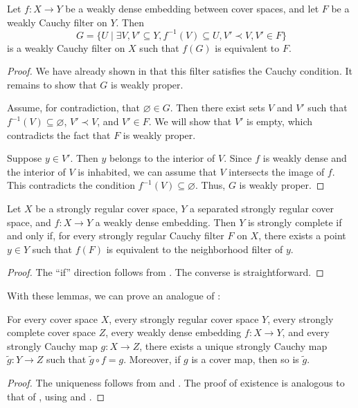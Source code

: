 \documentclass[pdflatex,sn-mathphys-num]{sn-jnl}
\theoremstyle{definition}
\theoremstyle{remark}
\numberwithin{figure}{section}
\newcommand{\rb}{\prec}
\begin{document}
\begin{lem}
Let $f : X \to Y$ be a weakly dense embedding between cover spaces, and let $F$ be a weakly Cauchy filter on $Y$.
Then
\[ G = \{ U \mid \exists V,V' \subseteq Y, f^{-1}(V) \subseteq U, V' \rb V, V' \in F \} \]
is a weakly Cauchy filter on $X$ such that $f(G)$ is equivalent to $F$.
\end{lem}
\begin{proof}
We have already shown in  that this filter satisfies the Cauchy condition.
It remains to show that $G$ is weakly proper.

Assume, for contradiction, that $\varnothing \in G$.
Then there exist sets $V$ and $V'$ such that $f^{-1}(V) \subseteq \varnothing$, $V' \rb V$, and $V' \in F$.
We will show that $V'$ is empty, which contradicts the fact that $F$ is weakly proper.

Suppose $y \in V'$.
Then $y$ belongs to the interior of $V$.
Since $f$ is weakly dense and the interior of $V$ is inhabited, we can assume that $V$ intersects the image of $f$.
This contradicts the condition $f^{-1}(V) \subseteq \varnothing$.
Thus, $G$ is weakly proper.
\end{proof}

\begin{lem}
Let $X$ be a strongly regular cover space, $Y$ a separated strongly regular cover space, and $f : X \to Y$ a weakly dense embedding.
Then $Y$ is strongly complete if and only if, for every strongly regular Cauchy filter $F$ on $X$, there exists a point $y \in Y$ such that $f(F)$ is equivalent to the neighborhood filter of $y$.
\end{lem}
\begin{proof}
The ``if'' direction follows from .
The converse is straightforward.
\end{proof}

With these lemmas, we can prove an analogue of :

\begin{thm}
For every cover space $X$, every strongly regular cover space $Y$, every strongly complete cover space $Z$, every weakly dense embedding $f : X \to Y$, and every strongly Cauchy map $g : X \to Z$,
there exists a unique strongly Cauchy map $\widetilde{g} : Y \to Z$ such that $\widetilde{g} \circ f = g$.
Moreover, if $g$ is a cover map, then so is $\widetilde{g}$.
\end{thm}
\begin{proof}
The uniqueness follows from  and .
The proof of existence is analogous to that of , using  and .
\end{proof}
\end{document}
